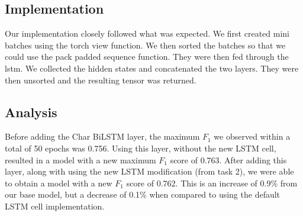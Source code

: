 \documentclass{article}
\begin{document}
\subsection*{Implementation}
Our implementation closely followed what was expected. We first created mini batches using the torch view function. We then sorted the batches so that we could use the pack padded sequence function. They were then fed through the lstm. We collected the hidden states and concatenated the two layers. They were then unsorted and the resulting tensor was returned.
\subsection*{Analysis}
Before adding the Char BiLSTM layer, the maximum $F_1$ we observed within a total of 50 epochs was 0.756. Using this layer, without the new LSTM cell, resulted in a model with a new maximum $F_1$ score of 0.763. After adding this layer, along with using the new LSTM modification (from task 2), we were able to obtain a model with a new $F_1$ score of 0.762. This is an increase of 0.9\% from our base model, but a decrease of 0.1\% when compared to using the default LSTM cell implementation.
\end{document}
